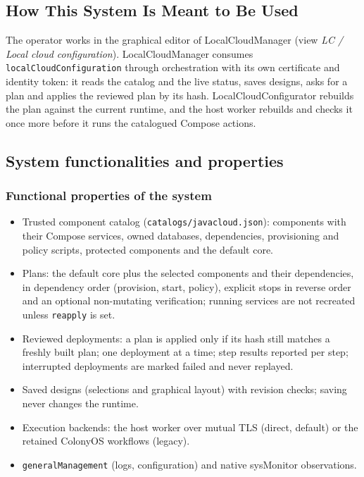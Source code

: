 \documentclass[a4paper]{arrowhead}
\begin{document}
\subsection{How This System Is Meant to Be Used}
\label{sec:use}

The operator works in the graphical editor of LocalCloudManager (view \emph{LC / Local cloud configuration}). LocalCloudManager consumes \texttt{local\allowbreak{}Cloud\allowbreak{}Configuration} through orchestration with its own certificate and identity token: it reads the catalog and the live status, saves designs, asks for a plan and applies the reviewed plan by its hash. LocalCloudConfigurator rebuilds the plan against the current runtime, and the host worker rebuilds and checks it once more before it runs the catalogued Compose actions.

\subsection{System functionalities and properties}
\label{sec:properties}

\subsubsection{Functional properties of the system}

\begin{itemize}
  \item Trusted component catalog (\texttt{catalogs/\allowbreak{}javacloud.\allowbreak{}json}): components with their Compose services, owned databases, dependencies, provisioning and policy scripts, protected components and the default core.
  \item Plans: the default core plus the selected components and their dependencies, in dependency order (provision, start, policy), explicit stops in reverse order and an optional non-mutating verification; running services are not recreated unless \texttt{reapply} is set.
  \item Reviewed deployments: a plan is applied only if its hash still matches a freshly built plan; one deployment at a time; step results reported per step; interrupted deployments are marked failed and never replayed.
  \item Saved designs (selections and graphical layout) with revision checks; saving never changes the runtime.
  \item Execution backends: the host worker over mutual TLS (direct, default) or the retained ColonyOS workflows (legacy).
  \item \texttt{general\allowbreak{}Management} (logs, configuration) and native sysMonitor observations.
\end{itemize}
\end{document}
